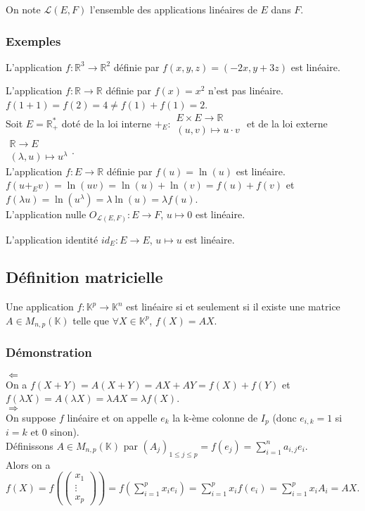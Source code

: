 \documentclass[a4paper,10pt]{book} %
\newcommand{\R}{\mathbb{R}}
\newcommand{\Rpe}{\mathbb{R}_{+}^{*}}
\newcommand{\K}{\mathbb{K}}
\begin{document}
On note $\mathcal{L}(E,F)$ l'ensemble des applications linéaires de $E$ dans $F$.

\subsubsection{Exemples}
L'application $f:\R^3 \rightarrow \R^2$ définie par $f(x,y,z)=(-2x,y+3z)$ est linéaire.

L'application $f:\R \rightarrow \R$ définie par $f(x)=x^2$ n'est pas linéaire.\\
$f(1+1)=f(2)=4\neq f(1)+f(1)=2$.\\

Soit $E=\Rpe$ doté de la loi interne $+_E:
\begin{matrix} E\times E\rightarrow \R \\ (u,v)\mapsto u\cdot v \end{matrix}$
et de la loi externe $\begin{matrix}\R\rightarrow E \\ (\lambda,u)\mapsto u^\lambda \end{matrix}$.\\
L'application $f :E\rightarrow \R$ définie par $f(u)=\ln(u)$ est linéaire.\\
$f(u+_{E} v)=\ln(uv)=\ln(u)+\ln(v)=f(u)+f(v)$ et $f(\lambda u)=\ln(u^\lambda)=\lambda \ln(u)=\lambda f(u)$.\\

L'application nulle $O_{\mathcal{L}(E,F)}:E\rightarrow F$, $u\mapsto 0$ est linéaire.

L'application identité $id_E:E\rightarrow E$, $u\mapsto u$ est linéaire.

\subsection{Définition matricielle}
Une application $f:\K^p\rightarrow \K^n$ est linéaire si et seulement si il existe une matrice $A\in M_{n,p}(\K)$ telle que $\forall X\in \K^p$, $f(X)=AX$.

\subsubsection{Démonstration}
$\Leftarrow$\\
On a $f(X+Y)=A(X+Y)=AX+AY=f(X)+f(Y)$ et $f(\lambda X)=A(\lambda X)=\lambda AX=\lambda f(X)$.\\

$\Rightarrow$\\
On suppose $f$ linéaire et on appelle $e_k$ la k-ème colonne de $I_p$ (donc $e_{i,k}=1$ si $i=k$ et 0 sinon).\\
Définissons $A\in M_{n,p} (\K)$ par $(A_j)_{1\leq j\leq p}=f(e_j)=\sum\limits_{i=1}^n a_{i,j}e_i$.\\
Alors on a $\displaystyle f(X)=f(\begin{pmatrix}
x_1 \\ \vdots \\ x_p
\end{pmatrix})=f(\sum\limits_{i=1}^p x_ie_i)=\sum\limits_{i=1}^p x_if(e_i)=\sum\limits_{i=1}^p x_iA_i=AX$.
\end{document}
